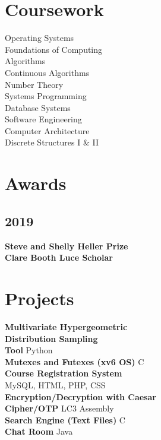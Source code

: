 \documentclass[]{deedy-resume-openfont}
\begin{document}
\begin{minipage}[t]{0.33\textwidth}
        \section{Coursework}
        Operating Systems\\
        Foundations of Computing\\
        Algorithms\\
        Continuous Algorithms\\
        Number Theory\\
        Systems Programming\\
        Database Systems\\
        Software Engineering\\
        Computer Architecture\\
        Discrete Structures I \& II \\


        \section{Awards}
        \subsection{2019}
        {\bf Steve and Shelly Heller Prize} \\
        {\bf Clare Booth Luce Scholar} \\

        \section{Projects}

        \textbf{Multivariate Hypergeometric \\Distribution Sampling \\Tool} Python\\
        \textbf{Mutexes and Futexes (xv6 OS)} C\\
        \textbf{Course Registration System} \\MySQL, HTML, PHP, CSS\\
        \textbf{Encryption/Decryption with Caesar \\Cipher/OTP} LC3 Assembly\\
        \textbf{Search Engine (Text Files)} C\\
        \textbf{Chat Room} Java\\


\end{minipage}
\end{document}
